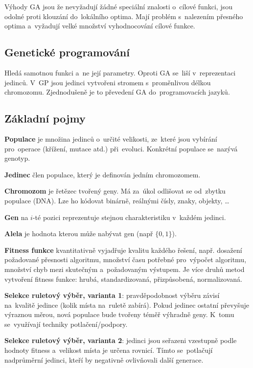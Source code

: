 Výhody GA jsou že nevyžadují žádné speciální znalosti o~cílové funkci, jsou odolné proti klouzání do~lokálního optima. Mají problém s~nalezením přesného optima a~vyžadují velké množství vyhodnocování cílové funkce.

\subsection{Genetické programování}

Hledá samotnou funkci a~ne její parametry. Oproti GA se~liší v~reprezentaci jedinců. V~GP jsou jedinci vytvořeni stromem s~proměnlivou délkou chromozomu. Zjednodušeně je to převedení GA do~programovacích jazyků.

\subsection{Základní pojmy}

\textbf{Populace} je množina jedinců o~určité velikosti, ze~které jsou vybírání pro~operace (křížení, mutace atd.) při~evoluci. Konkrétní populace se~nazývá genotyp.

\textbf{Jedinec} člen populace, který je definován jedním chromozomem.

\textbf{Chromozom} je řetězec tvořený geny. Má za~úkol odlišovat se od~zbytku populace (DNA). Lze ho kódovat binárně, reálnými čísly, znaky, objekty, \dots

\textbf{Gen} na \( i \)-té pozici reprezentuje stejnou charakteristiku v~každém jedinci.

\textbf{Alela} je hodnota kterou může nabývat gen (např \( \{0, 1\} \)).

\textbf{Fitness funkce} kvantitativně vyjadřuje kvalitu každého řešení, např. dosažení požadované přesnosti algoritmu, množství času potřebné pro~výpočet algoritmu, množství chyb mezi skutečným a~požadovaným výstupem. Je více druhů metod vytvoření fitness funkce: hrubá, standardizovaná, přizpůsobená, normalizovaná.

\textbf{Selekce ruletový výběr, varianta 1}: pravděpodobnost výběru závisí na~kvalitě jedince (kolik místa na~ruletě zabírá). Pokud jedinec ostatní převyšuje výraznou měrou, nová populace bude tvořeny téměř výhradně geny. K~tomu se~využívají techniky potlačení/podpory.

\textbf{Selekce ruletový výběr, varianta 2}: jedinci jsou seřazeni vzestupně podle hodnoty fitness a~velikost místa je určena rovnicí. Tímto se~potlačují nadprůměrní jedinci, kteří by negativně ovlivňovali další generace.

